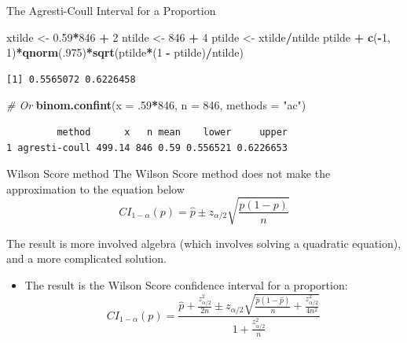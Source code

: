 \documentclass[
  ignorenonframetext,
]{beamer}
\newenvironment{Shaded}{\begin{snugshade}}{\end{snugshade}}
\newcommand{\AttributeTok}[1]{\textcolor[rgb]{0.13,0.29,0.53}{#1}}
\newcommand{\CommentTok}[1]{\textcolor[rgb]{0.56,0.35,0.01}{\textit{#1}}}
\newcommand{\DecValTok}[1]{\textcolor[rgb]{0.00,0.00,0.81}{#1}}
\newcommand{\FloatTok}[1]{\textcolor[rgb]{0.00,0.00,0.81}{#1}}
\newcommand{\FunctionTok}[1]{\textcolor[rgb]{0.13,0.29,0.53}{\textbf{#1}}}
\newcommand{\NormalTok}[1]{#1}
\newcommand{\OtherTok}[1]{\textcolor[rgb]{0.56,0.35,0.01}{#1}}
\newcommand{\SpecialCharTok}[1]{\textcolor[rgb]{0.81,0.36,0.00}{\textbf{#1}}}
\newcommand{\StringTok}[1]{\textcolor[rgb]{0.31,0.60,0.02}{#1}}
\providecommand{\tightlist}{%
  \setlength{\itemsep}{0pt}\setlength{\parskip}{0pt}}
\begin{document}
\begin{frame}[fragile]{The Agresti-Coull Interval for a Proportion}
\protect\hypertarget{the-agresti-coull-interval-for-a-proportion-2}{}
\small

\begin{Shaded}
\begin{Highlighting}[]
\NormalTok{xtilde }\OtherTok{\textless{}{-}} \FloatTok{0.59}\SpecialCharTok{*}\DecValTok{846} \SpecialCharTok{+} \DecValTok{2}
\NormalTok{ntilde }\OtherTok{\textless{}{-}} \DecValTok{846} \SpecialCharTok{+} \DecValTok{4}
\NormalTok{ptilde }\OtherTok{\textless{}{-}}\NormalTok{ xtilde}\SpecialCharTok{/}\NormalTok{ntilde}
\NormalTok{ptilde }\SpecialCharTok{+} \FunctionTok{c}\NormalTok{(}\SpecialCharTok{{-}}\DecValTok{1}\NormalTok{, }\DecValTok{1}\NormalTok{)}\SpecialCharTok{*}\FunctionTok{qnorm}\NormalTok{(.}\DecValTok{975}\NormalTok{)}\SpecialCharTok{*}\FunctionTok{sqrt}\NormalTok{(ptilde}\SpecialCharTok{*}\NormalTok{(}\DecValTok{1} \SpecialCharTok{{-}}\NormalTok{ ptilde)}\SpecialCharTok{/}\NormalTok{ntilde)}
\end{Highlighting}
\end{Shaded}

\begin{verbatim}
[1] 0.5565072 0.6226458
\end{verbatim}

\begin{Shaded}
\begin{Highlighting}[]
\CommentTok{\# Or}
\FunctionTok{binom.confint}\NormalTok{(}\AttributeTok{x =}\NormalTok{ .}\DecValTok{59}\SpecialCharTok{*}\DecValTok{846}\NormalTok{, }\AttributeTok{n =} \DecValTok{846}\NormalTok{, }\AttributeTok{methods =} \StringTok{"ac"}\NormalTok{)}
\end{Highlighting}
\end{Shaded}

\begin{verbatim}
         method      x   n mean    lower     upper
1 agresti-coull 499.14 846 0.59 0.556521 0.6226653
\end{verbatim}

\normalsize
\end{frame}

\begin{frame}{Wilson Score method}
\protect\hypertarget{wilson-score-method}{}
The Wilson Score method does not make the approximation to the equation
below
\[CI_{1 - \alpha}(p)=\hat{p}\pm z_{\alpha/2}\sqrt{\frac{p(1-p)}{n}}\]

The result is more involved algebra (which involves solving a quadratic
equation), and a more complicated solution.

\begin{itemize}
\tightlist
\item
  The result is the Wilson Score confidence interval for a proportion:
  \[CI_{1-\alpha}(p)=\frac{\hat{p}+\frac{z^2_{\alpha/2}}{2n}\pm z_{\alpha/2}\sqrt{\frac{\hat{p}(1-\hat{p})}{n}+\frac{z^2_{\alpha/2}}{4n^2}}}{1+\frac{z^2_{\alpha/2}}{n}}\]
\end{itemize}
\end{frame}
\end{document}
